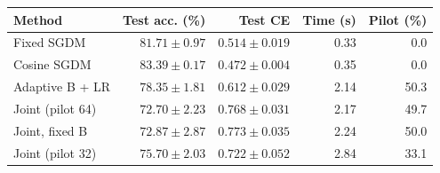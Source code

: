 \begin{tabular}{lrrrr}
\toprule
Method & Test acc. (\%) & Test CE & Time (s) & Pilot (\%) \\
\midrule
Fixed SGDM & $81.71\pm0.97$ & $0.514\pm0.019$ & 0.33 & 0.0 \\
Cosine SGDM & $83.39\pm0.17$ & $0.472\pm0.004$ & 0.35 & 0.0 \\
Adaptive B + LR & $78.35\pm1.81$ & $0.612\pm0.029$ & 2.14 & 50.3 \\
Joint (pilot 64) & $72.70\pm2.23$ & $0.768\pm0.031$ & 2.17 & 49.7 \\
Joint, fixed B & $72.87\pm2.87$ & $0.773\pm0.035$ & 2.24 & 50.0 \\
Joint (pilot 32) & $75.70\pm2.03$ & $0.722\pm0.052$ & 2.84 & 33.1 \\
\bottomrule
\end{tabular}
